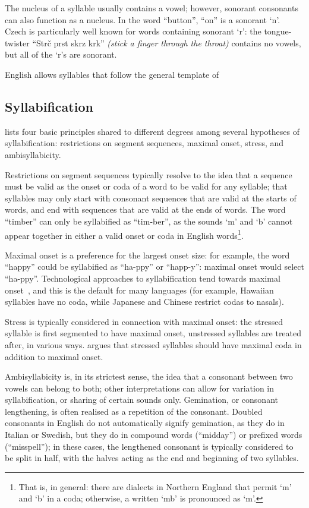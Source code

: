 \documentclass{article}[11pt]
\begin{document}
The nucleus of a syllable usually contains a vowel; however, sonorant consonants can also function as a nucleus. In the word ``button'', ``on'' is a sonorant `n'. Czech is particularly well known for words containing sonorant `r': the tongue-twister ``Str\v{c} prst skrz krk'' \textit{(stick a finger through the throat)} contains no vowels, but all of the `r's are sonorant.

English allows syllables that follow the general template of 

\subsection{Syllabification}
\label{ssect:syllabification}

\citet{fallows_experimental_1981} lists four basic principles shared to different degrees among several hypotheses of syllabification: restrictions on segment sequences, maximal onset, stress, and ambisyllabicity.

Restrictions on segment sequences typically resolve to the idea that a sequence must be valid as the onset or coda of a word to be valid for any syllable; that syllables may only start with consonant sequences that are valid at the starts of words, and end with sequences that are valid at the ends of words. The word ``timber'' can only be syllabified as ``tim-ber'', as the sounds `m' and `b' cannot appear together in either a valid onset or coda in English words\footnote{That is, in general: there are dialects in Northern England that permit `m' and `b' in a coda; otherwise, a written `mb' is pronounced as `m'.}.

Maximal onset is a preference for the largest onset size: for example, the word ``happy'' could be syllabified as ``ha-ppy'' or ``happ-y'': maximal onset would select ``ha-ppy''. Technological approaches to syllabification tend towards maximal onset~\citep{ladefoged_course_2011}, and this is the default for many languages (for example, Hawaiian syllables have no coda, while Japanese and Chinese restrict codas to nasals).

Stress is typically considered in connection with maximal onset: the stressed syllable is first segmented to have maximal onset, unstressed syllables are treated after, in various ways. \citet{wells_syllabification_2019} argues 
that stressed syllables should have maximal coda in addition to maximal onset.

Ambisyllabicity is, in its strictest sense, the idea that a consonant between two vowels can belong to both; other interpretations can allow for variation in syllabification, or sharing of certain sounds only. Gemination, or consonant lengthening, is often realised as a repetition of the consonant. Doubled consonants in English do not automatically signify gemination, as they do in Italian or Swedish, but they do in compound words (``midday'') or prefixed words (``misspell''); in these cases, the lengthened consonant is typically considered to be split in half, with the halves acting as the end and beginning of two syllables. 
\end{document}

